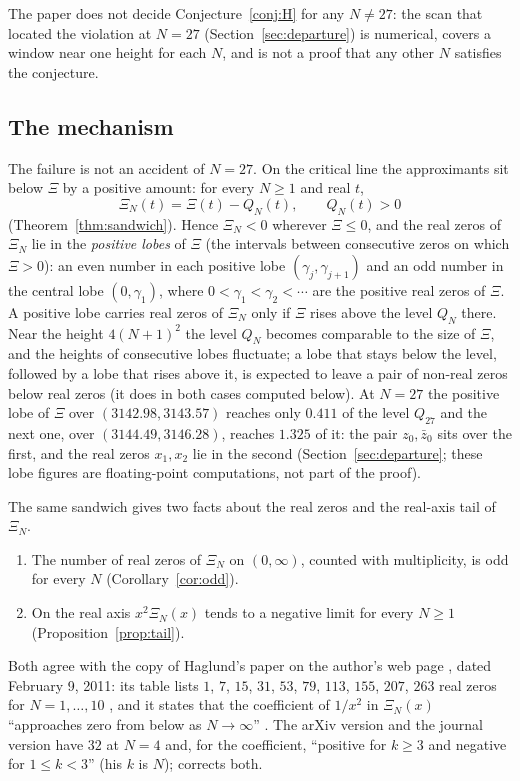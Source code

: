 \documentclass[11pt]{article}
\theoremstyle{plain}
\theoremstyle{definition}
\theoremstyle{remark}
\begin{document}
The paper does not decide Conjecture~\ref{conj:H} for any $N \ne 27$: the scan
that located the violation at $N = 27$ (Section~\ref{sec:departure}) is
numerical, covers a window near one height for each $N$, and is not a proof that
any other $N$ satisfies the conjecture.

\subsection{The mechanism}\label{sec:mech}

The failure is not an accident of $N = 27$. On the critical line the approximants
sit below $\Xi$ by a positive amount: for every $N \ge 1$ and real $t$,
\[
\Xi_N(t) = \Xi(t) - Q_N(t), \qquad Q_N(t) > 0
\]
(Theorem~\ref{thm:sandwich}). Hence $\Xi_N < 0$ wherever $\Xi \le 0$, and the real
zeros of $\Xi_N$ lie in the \emph{positive lobes} of $\Xi$ (the intervals between
consecutive zeros on which $\Xi > 0$): an even number in each positive lobe
$(\gamma_j, \gamma_{j+1})$ and an odd number in the central lobe $(0, \gamma_1)$,
where $0 < \gamma_1 < \gamma_2 < \cdots$ are the positive real zeros of $\Xi$. A
positive lobe carries real zeros of $\Xi_N$ only if $\Xi$ rises above the level $Q_N$ there. Near the height $4(N+1)^2$ the
level $Q_N$ becomes comparable to the size of $\Xi$, and the heights of
consecutive lobes fluctuate; a lobe that stays below the level, followed by a
lobe that rises above it, is expected to leave a pair of non-real zeros below real
zeros (it does in both cases computed below). At
$N = 27$ the positive lobe of $\Xi$ over $(3142.98, 3143.57)$ reaches only
$0.411$ of the level $Q_{27}$ and the next one, over $(3144.49, 3146.28)$,
reaches $1.325$ of it: the pair $z_0, \bar z_0$ sits over the first, and the real
zeros $x_1, x_2$ lie in the second (Section~\ref{sec:departure}; these lobe
figures are floating-point computations, not part of the proof).

The same sandwich gives two facts about the real zeros and the real-axis tail
of $\Xi_N$.
\begin{enumerate}
\item[(i)] The number of real zeros of $\Xi_N$ on $(0,\infty)$, counted with
multiplicity, is odd for every $N$ (Corollary~\ref{cor:odd}).
\item[(ii)] On the real axis $x^2\Xi_N(x)$ tends to a negative limit for every
$N \ge 1$ (Proposition~\ref{prop:tail}).
\end{enumerate}
Both agree with the copy of Haglund's paper on the author's web page
\cite{HagW}, dated February 9, 2011: its table lists $1$, $7$, $15$, $31$,
$53$, $79$, $113$, $155$, $207$, $263$ real zeros for $N = 1, \ldots, 10$
\cite[p.~4]{HagW}, and it states that the coefficient of $1/x^2$ in $\Xi_N(x)$
``approaches zero from below as $N \to \infty$'' \cite[p.~10]{HagW}. The arXiv
version \cite{Hag} and the journal version \cite{HagJ} have $32$ at $N = 4$
and, for the coefficient, ``positive for $k \ge 3$ and negative for
$1 \le k < 3$'' \cite[p.~10]{Hag} (his $k$ is $N$); \cite{HagW} corrects
both.
\end{document}
